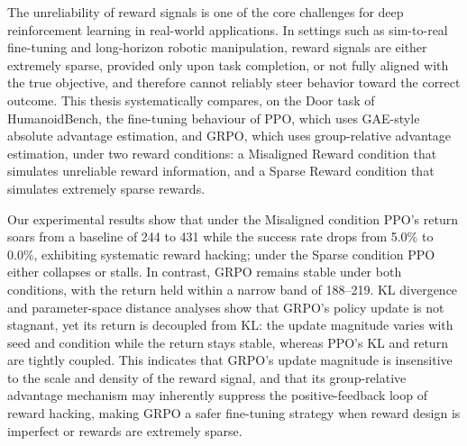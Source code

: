 The unreliability of reward signals is one of the core challenges for deep reinforcement learning in real-world applications. In settings such as sim-to-real fine-tuning and long-horizon robotic manipulation, reward signals are either extremely sparse, provided only upon task completion, or not fully aligned with the true objective, and therefore cannot reliably steer behavior toward the correct outcome. This thesis systematically compares, on the Door task of HumanoidBench, the fine-tuning behaviour of PPO, which uses GAE-style absolute advantage estimation, and GRPO, which uses group-relative advantage estimation, under two reward conditions: a Misaligned Reward condition that simulates unreliable reward information, and a Sparse Reward condition that simulates extremely sparse rewards.

Our experimental results show that under the Misaligned condition PPO's return soars from a baseline of 244 to 431 while the success rate drops from 5.0\% to 0.0\%, exhibiting systematic reward hacking; under the Sparse condition PPO either collapses or stalls. In contrast, GRPO remains stable under both conditions, with the return held within a narrow band of 188--219. KL divergence and parameter-space distance analyses show that GRPO's policy update is not stagnant, yet its return is decoupled from KL: the update magnitude varies with seed and condition while the return stays stable, whereas PPO's KL and return are tightly coupled. This indicates that GRPO's update magnitude is insensitive to the scale and density of the reward signal, and that its group-relative advantage mechanism may inherently suppress the positive-feedback loop of reward hacking, making GRPO a safer fine-tuning strategy when reward design is imperfect or rewards are extremely sparse.
